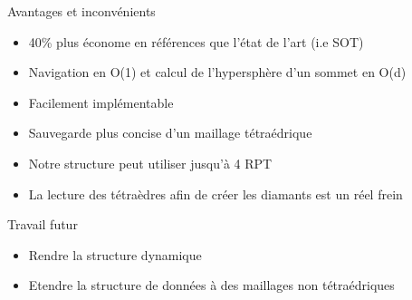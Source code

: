 \documentclass[9pt]{beamer}
\begin{document}
\begin{frame}
\begin{block}{Avantages et inconvénients}
\begin{itemize}
\color{blue}
\item 40\% plus économe en références que l'état de l'art (i.e SOT)
\item Navigation en O(1) et calcul de l'hypersphère d'un sommet en O(d)
\item Facilement implémentable
\item Sauvegarde plus concise d'un maillage tétraédrique
\color{red}
\item Notre structure peut utiliser jusqu'à 4 RPT
\item La lecture des tétraèdres afin de créer les diamants est un réel frein
\end{itemize}
\color{blue}
\end{block}
\vspace{-4.5pt}
\begin{block}{Travail futur}
\begin{itemize}
\item Rendre la structure dynamique
\item Etendre la structure de données à des maillages non tétraédriques
\end{itemize}
\end{block}
\end{frame}
\end{document}
